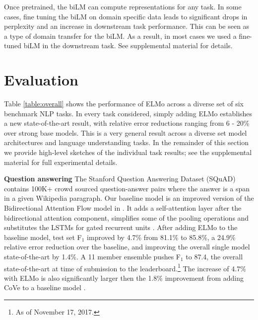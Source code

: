 \documentclass[11pt,a4paper]{article}
\newcommand{\ELMO}{ELMo}
\newcommand{\tinysection}[1]{\textbf{#1}}
\newcommand\mgcomment[1]{\textcolor{blue}{\textbf{[#1] --\textsc{MG}}}}
\begin{document}
Once pretrained, the biLM can compute representations for any task.
In some cases, fine tuning the biLM on domain specific data leads to significant drops in perplexity and an increase in downstream task performance.
This can be seen as a type of domain transfer for the biLM.
As a result, in most cases we used a fine-tuned biLM in the downstream task.
See supplemental material for details.


%

\section{Evaluation}
\label{sec:results}
Table \ref{table:overall} shows the performance of \ELMO{} across a diverse set of six benchmark NLP tasks.
In every task considered, simply adding \ELMO{} establishes a new state-of-the-art result, with relative error reductions ranging from 6 - 20\% over strong base models.
This is a very general result across a diverse set model architectures and language understanding tasks.
In the remainder of this section we provide high-level sketches of the individual task results; see the supplemental material for full experimental details.


\tinysection{Question answering}
The Stanford Question Answering Dataset (SQuAD) \citep{Rajpurkar2016SQuAD10} contains 100K+ crowd sourced question-answer pairs where the answer is a span in a given Wikipedia paragraph.
Our baseline model \citep{ClarkAdvancingRC} is an improved version of the Bidirectional Attention Flow model in \citet[BiDAF; ][]{Seo2016BidirectionalAF}.  It adds a self-attention layer after the bidirectional attention component, simplifies some of the pooling operations and substitutes the LSTMs for gated recurrent units \citep[GRUs; ][]{GRU:Cho2014}.
After adding \ELMO{} to the baseline model, test set F$_1$ improved by 4.7\% from 81.1\% to 85.8\%, a 24.9\% relative error reduction over the baseline, and improving the overall single model state-of-the-art by 1.4\%.
A 11 member ensemble pushes F$_1$ to 87.4, the overall state-of-the-art at time of submission to the leaderboard.\footnote{As of November 17, 2017. %
}
The increase of 4.7\% with ELMo is also significantly larger then the 1.8\% improvement from adding CoVe to a baseline model \citep{McCann2017LearnedIT}.
\end{document}
